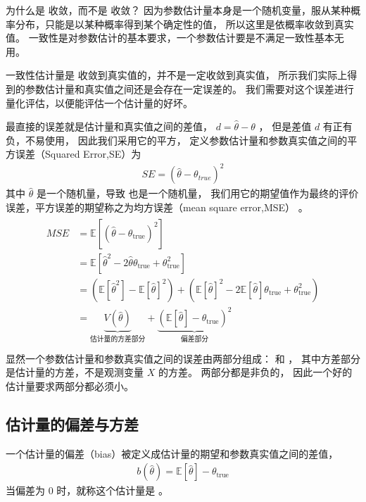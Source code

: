 \documentclass[letterpaper,10pt,english]{sphinxmanual}
\begin{document}
为什么是  收敛，而不是  收敛？
因为参数估计量本身是一个随机变量，服从某种概率分布，只能是以某种概率得到某个确定性的值，
所以这里是依概率收敛到真实值。
一致性是对参数估计的基本要求，一个参数估计要是不满足一致性基本无用。

一致性估计量是  收敛到真实值的，并不是一定收敛到真实值，
所示我们实际上得到的参数估计量和真实值之间还是会存在一定误差的。
我们需要对这个误差进行量化评估，以便能评估一个估计量的好坏。

最直接的误差就是估计量和真实值之间的差值， \(d=\hat{\theta}-\theta\) ，
但是差值 \(d\) 有正有负，不易使用，
因此我们采用它的平方，
定义参数估计量和参数真实值之间的平方误差（Squared Error,SE）为
\begin{equation}\label{equation:推断与检验/content:推断与检验/content:48}
\begin{split}SE = (\hat{\theta}-\theta_{true})^2\end{split}
\end{equation}
其中 \(\hat{\theta}\) 是一个随机量，导致  也是一个随机量，
我们用它的期望值作为最终的评价误差，平方误差的期望称之为均方误差（mean square error,MSE）
。
\begin{align}\label{equation:推断与检验/content:eq_2_39}\!\begin{aligned}
MSE &= \mathbb{E} [(\hat{\theta}- \theta_{\text{true}} )^2]\\
&= \mathbb{E}[ \hat{\theta}^2-2 \hat{\theta} \theta_{\text{true}} + \theta_{\text{true}}^2    ]\\
&= \left ( \mathbb{E}[\hat{\theta}^2]- \mathbb{E}[\hat{\theta}]^2 \right )
+\left ( \mathbb{E}[\hat{\theta}]^2    -2\mathbb{E}[\hat{\theta}] \theta_{\text{true}} + \theta_{\text{true}}^2   \right )\\
&= \underbrace{V (\hat{\theta})}_{\text{估计量的方差部分}}
 +
\underbrace{\left ( \mathbb{E}[\hat{\theta}]- \theta_{\text{true}}\right)^2}_{\text{偏差部分}}\\
\end{aligned}\end{align}
显然一个参数估计量和参数真实值之间的误差由两部分组成： 和  ，
其中方差部分是估计量的方差，不是观测变量 \(X\) 的方差。
两部分都是非负的，
因此一个好的估计量要求两部分都必须小。


\subsection{估计量的偏差与方差}
\label{\detokenize{_u63a8_u65ad_u4e0e_u68c0_u9a8c/content:id13}}
一个估计量的偏差（bias）被定义成估计量的期望和参数真实值之间的差值，
\begin{equation}\label{equation:推断与检验/content:推断与检验/content:49}
\begin{split}b(\hat{\theta}) = \mathbb{E}[\hat{\theta} ]
- \theta_{\text{true}}\end{split}
\end{equation}
当偏差为 \(0\) 时，就称这个估计量是 。
\end{document}

